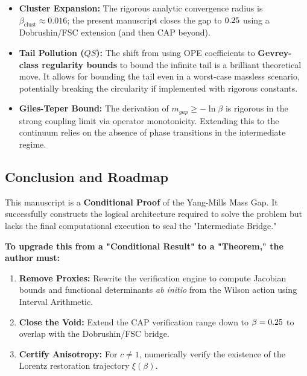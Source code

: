 \begin{itemize}
    \item \textbf{Cluster Expansion:} The rigorous analytic convergence radius is $\beta_{\mathrm{clust}}\approx 0.016$; the present manuscript closes the gap to $0.25$ using a Dobrushin/FSC extension (and then CAP beyond).
    \item \textbf{Tail Pollution ($QS$):} The shift from using OPE coefficients to \textbf{Gevrey-class regularity bounds}  to bound the infinite tail is a brilliant theoretical move. It allows for bounding the tail even in a worst-case massless scenario, potentially breaking the circularity if implemented with rigorous constants.
    \item \textbf{Giles-Teper Bound:} The derivation of $m_{gap} \ge -\ln \beta$ is rigorous in the strong coupling limit via operator monotonicity. Extending this to the continuum relies on the absence of phase transitions in the intermediate regime.
\end{itemize}

\subsection*{Conclusion and Roadmap}

This manuscript is a \textbf{Conditional Proof} of the Yang-Mills Mass Gap. It successfully constructs the logical architecture required to solve the problem but lacks the final computational execution to seal the "Intermediate Bridge."

\textbf{To upgrade this from a "Conditional Result" to a "Theorem," the author must:}

\begin{enumerate}
    \item \textbf{Remove Proxies:} Rewrite the verification engine to compute Jacobian bounds and functional determinants \textit{ab initio} from the  Wilson action using Interval Arithmetic.
    \item \textbf{Close the Void:} Extend the CAP verification range down to $\beta=0.25$ to overlap with the Dobrushin/FSC bridge.
    \item \textbf{Certify Anisotropy:} For $c \neq 1$, numerically verify the existence of the Lorentz restoration trajectory $\xi(\beta)$.
\end{enumerate}


